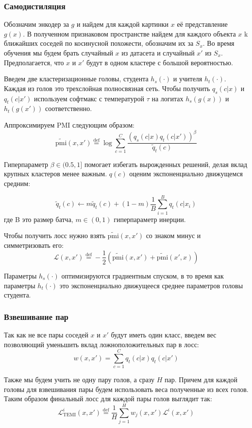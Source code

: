 \documentclass[a4paper,12pt]{extarticle}
\newcommand{\defeq}{\stackrel{\text{def}}{=}}
\begin{document}
\subsubsection{Самодистиляция}

Обозначим энкодер за $g$ и найдем для каждой картинки 
$x$ её представление $g(x)$. В полученном признаковом пространстве 
найдем для каждого объекта $x$ k ближайших соседей по косинусной похожести, 
обозначим их за $S_x$. Во время обучения мы будем брать случайный 
$x$ из датасета и случайный $x'$ из $S_x$. Предполагается, что 
$x$ и $x'$ будут в одном кластере с большой вероятностью. 

Введем две кластеризационные головы, студента $h_s(\cdot)$
и учителя $h_t(\cdot)$. Каждая из голов это трехслойная 
полносвязная сеть. Чтобы получить $q_s(c|x)$ и $q_t(c|x')$ 
используем софтмакс с температурой $\tau$ на логитах 
$h_s(g(x))$ и $h_t(g(x'))$ соответственно. 

Аппроксимируем PMI следующим образом:
\[
	\widetilde{\text{pmi}}(x, x') \defeq \log 
	\sum_{c=1}^C \frac{(q_s(c|x)q_t(c|x'))^{\beta}}{\tilde{q}_t(c)}
\]

Гиперпараметр $\beta\in(0.5, 1]$ помогает 
избегать вырожденных решений, делая вклад крупных кластеров 
менее важным. $q(c)$ оценим экспоненциально движущемся средним:

\[
	\tilde{q}_t(c)\leftarrow m \tilde{q}_t(c) + 
	(1-m)\frac{1}{B}\sum_{i=1}^B q_t(c|x_i)
\]
где B это размер батча, $m\in(0, 1)$ гиперпараметр инерции.

Чтобы получить лосс нужно взять $\widetilde{\text{pmi}}(x, x')$ 
со знаком минус и симметризовать его:
\[
	\mathcal{L}(x, x') \defeq 
	-\frac{1}{2}\left(\widetilde{\text{pmi}}(x, x') 
	+\widetilde{\text{pmi}}(x', x)\right)
\]

Параметры $h_s(\cdot)$ оптимизируются градиентным спуском, 
в то время как параметры $h_t(\cdot)$ это экспоненциально 
движущееся среднее параметров головы студента.  

\subsubsection{Взвешивание пар}

Так как не все пары соседей $x$ и $x'$ будут иметь 
один класс, введем вес позволяющий уменьшить вклад 
ложноположительных пар в лосс:
\[
	w(x, x')=\sum_{c=1}^C q_t(c|x)q_t(c|x')
\]

Также мы будем учить не одну пару голов, а сразу 
$H$ пар. Причем для каждой головы для взвешивания 
пары будем использовать веса полученные из всех голов. 
Таким образом финальный лосс для каждой пары голов выглядит 
так:
\[
	\mathcal{L}_{\text{TEMI}}^i(x, x')\defeq 
	\frac{1}{H}\sum_{j=1}^H w_j(x, x')\mathcal{L}^i(x, x')
\]
\end{document}
